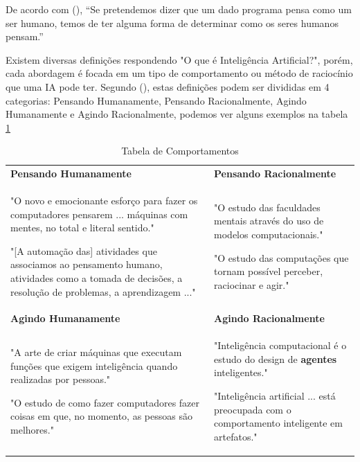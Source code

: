 \documentclass[
	12pt,				%
	openright,			%
	oneside,			%
	a4paper,			%
	english,			%
	spanish,			%
	brazil				%
	]{abntex2}
\begin{document}
	De acordo com \citeauthor{norvig} (\citeyear{norvig}), “Se pretendemos dizer que um dado programa pensa como um ser humano, temos de ter alguma forma de determinar como os seres humanos pensam.”
	
	Existem diversas definições respondendo "O que é Inteligência Artificial?", porém, cada abordagem é focada em um tipo de comportamento ou método de raciocínio que uma IA pode ter. Segundo \citeauthor{norvig} (\citeyear{norvig}), estas definições podem ser divididas em 4 categorias: Pensando Humanamente, Pensando Racionalmente, Agindo Humanamente e Agindo Racionalmente, podemos ver alguns exemplos na tabela \ref{Quatro Categorias}
	

\begin{table}[!h]

\centering
{\renewcommand\arraystretch{1.25}
\begin{tabular}{|l|l|l|} \hline \toprule

\multicolumn{1}{p{7.5cm}|}{\textbf{Pensando Humanamente}} 
& 
\multicolumn{2}{p{7.5cm}|}{\textbf{Pensando Racionalmente}} \\

\multicolumn{1}{p{7.5cm}|}{
"O novo e emocionante esforço para fazer os computadores pensarem ... máquinas com mentes, no total e literal sentido." \cite{haugeland}

"[A automação das] atividades que associamos ao pensamento humano, atividades como a tomada de decisões, a resolução de problemas, a aprendizagem ..." \cite{bellman}

} 
& 
\multicolumn{2}{p{7.5cm}|}{

"O estudo das faculdades mentais através do uso de modelos computacionais." \cite{charniak_mcdermott}

"O estudo das computações que tornam possível perceber, raciocinar e agir." \cite{winston}

} \\

\hline


\multicolumn{1}{p{7.5cm}|}{\textbf{Agindo Humanamente}} 
& 
\multicolumn{2}{p{7.5cm}|}{\textbf{Agindo Racionalmente}} \\ 

\multicolumn{1}{p{7.5cm}|}{

"A arte de criar máquinas que executam funções que exigem inteligência quando realizadas por pessoas." \cite{kurzweil}

"O estudo de como fazer computadores fazer coisas em que, no momento, as pessoas são melhores." \cite{rich_knight}

} 
& 
\multicolumn{2}{p{7.5cm}|}{

"Inteligência computacional é o estudo do design de \textbf{agentes} inteligentes." \cite{poole}

"Inteligência artificial ... está preocupada com o comportamento inteligente em artefatos." \cite{nilsson}

} \\ \hline


\end{tabular}}
\caption{Tabela de Comportamentos}
\label{Quatro Categorias}
\end{table}
	
\end{document}
